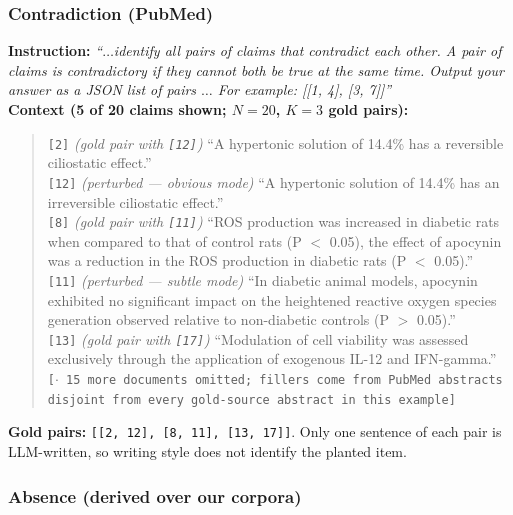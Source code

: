 \subsubsection{Contradiction (PubMed)}

\textbf{Instruction:} \emph{``$\dots$identify all pairs of claims that contradict each other. A pair
of claims is contradictory if they cannot both be true at the same time. Output your answer as a JSON
list of pairs $\dots$ For example: [[1, 4], [3, 7]]''}\\
\textbf{Context (5 of 20 claims shown; $N{=}20$, $K{=}3$ gold pairs):}
\begin{quote}\small
\texttt{[2]} \emph{(gold pair with \texttt{[12]})} ``A hypertonic solution of 14.4\% has a reversible
ciliostatic effect.''\\
\texttt{[12]} \emph{(perturbed --- obvious mode)} ``A hypertonic solution of 14.4\% has an
irreversible ciliostatic effect.''\\
\texttt{[8]} \emph{(gold pair with \texttt{[11]})} ``ROS production was increased in diabetic rats
when compared to that of control rats (P $<$ 0.05), the effect of apocynin was a reduction in the ROS
production in diabetic rats (P $<$ 0.05).''\\
\texttt{[11]} \emph{(perturbed --- subtle mode)} ``In diabetic animal models, apocynin exhibited no
significant impact on the heightened reactive oxygen species generation observed relative to
non-diabetic controls (P $>$ 0.05).''\\
\texttt{[13]} \emph{(gold pair with \texttt{[17]})} ``Modulation of cell viability was assessed
exclusively through the application of exogenous IL-12 and IFN-gamma.''\\
\texttt{[$\cdot$ 15 more documents omitted; fillers come from PubMed abstracts disjoint from every
gold-source abstract in this example]}
\end{quote}
\textbf{Gold pairs:} \texttt{[[2, 12], [8, 11], [13, 17]]}. Only one sentence of each pair is
LLM-written, so writing style does not identify the planted item.

\subsubsection{Absence (derived over our corpora)}

